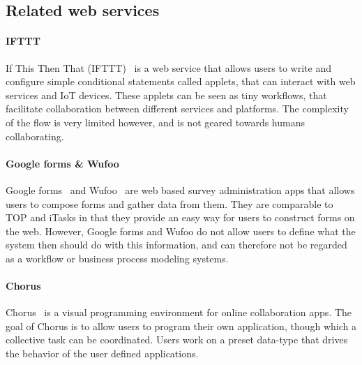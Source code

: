 \subsection{Related web services}


\paragraph{IFTTT}

If This Then That (IFTTT)~\cite{IFTTT} is a web service that allows users to write and
configure simple conditional statements called applets, that can interact with
web services and IoT devices. These applets can be seen as tiny workflows, that
facilitate collaboration between different services and platforms. The
complexity of the flow is very limited however, and is not geared towards humans
collaborating.

\paragraph{Google forms \& Wufoo}

Google forms~\cite{googleforms} and Wufoo~\cite{wufoo} are web based survey administration apps that allows
users to compose forms and gather data from them. They are comparable to TOP and
iTasks in that they provide an easy way for users to construct forms on the web.
However, Google forms and Wufoo do not allow users to define what the system
then should do with this information, and can therefore not be regarded as a
workflow or business process modeling systems.

\paragraph{Chorus} %

Chorus~\cite{chen2017chorus} is a visual programming environment for online
collaboration apps. The goal of Chorus is to allow users to program their own
application, though which a collective task can be coordinated. Users work on a
preset data-type that drives the behavior of the user defined applications.
